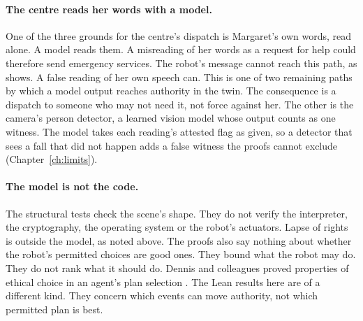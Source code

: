\paragraph{The centre reads her words with a model.}
One of the three grounds for the centre's dispatch is Margaret's own words, read alone.
A model reads them.
A misreading of her words as a request for help could therefore send emergency services.
The robot's message cannot reach this path, as  shows.
A false reading of her own speech can.
This is one of two remaining paths by which a model output reaches authority in the twin.
The consequence is a dispatch to someone who may not need it, not force against her.
The other is the camera's person detector, a learned vision model whose output counts as one
witness.
The model takes each reading's attested flag as given, so a detector that sees a fall that did not
happen adds a false witness the proofs cannot exclude (Chapter~\ref{ch:limits}).

\paragraph{The model is not the code.}
The structural tests check the scene's shape.
They do not verify the interpreter, the cryptography, the operating system or the robot's
actuators.
Lapse of rights is outside the model, as noted above.
The proofs also say nothing about whether the robot's permitted choices are good ones.
They bound what the robot may do.
They do not rank what it should do.
Dennis and colleagues proved properties of ethical choice in an agent's plan selection
\cite{dennis2016formal}.
The Lean results here are of a different kind.
They concern which events can move authority, not which permitted plan is best.
